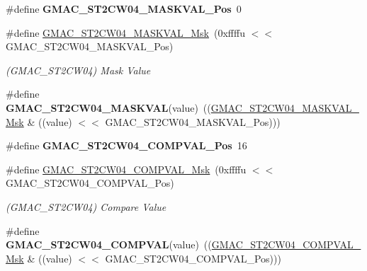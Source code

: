 \begin{DoxyCompactItemize}
\#define {\bfseries G\+M\+A\+C\+\_\+\+S\+T2\+C\+W04\+\_\+\+M\+A\+S\+K\+V\+A\+L\+\_\+\+Pos}~0
\item 
\mbox{\label{group__SAME70__GMAC_ga4394077d563ce8a66f566e49b3370d14}} 
\#define \mbox{\hyperlink{group__SAME70__GMAC_ga4394077d563ce8a66f566e49b3370d14}{G\+M\+A\+C\+\_\+\+S\+T2\+C\+W04\+\_\+\+M\+A\+S\+K\+V\+A\+L\+\_\+\+Msk}}~(0xffffu $<$$<$ G\+M\+A\+C\+\_\+\+S\+T2\+C\+W04\+\_\+\+M\+A\+S\+K\+V\+A\+L\+\_\+\+Pos)
\begin{DoxyCompactList}\small\item\em (G\+M\+A\+C\+\_\+\+S\+T2\+C\+W04) Mask Value \end{DoxyCompactList}\item 
\mbox{\label{group__SAME70__GMAC_ga77a548f54616a0c94acf93e1614e2536}} 
\#define {\bfseries G\+M\+A\+C\+\_\+\+S\+T2\+C\+W04\+\_\+\+M\+A\+S\+K\+V\+AL}(value)~((\mbox{\hyperlink{group__SAMV71__GMAC_ga4394077d563ce8a66f566e49b3370d14}{G\+M\+A\+C\+\_\+\+S\+T2\+C\+W04\+\_\+\+M\+A\+S\+K\+V\+A\+L\+\_\+\+Msk}} \& ((value) $<$$<$ G\+M\+A\+C\+\_\+\+S\+T2\+C\+W04\+\_\+\+M\+A\+S\+K\+V\+A\+L\+\_\+\+Pos)))
\item 
\mbox{\label{group__SAME70__GMAC_ga17bb7bc450aeda5e82c91e61132378c4}} 
\#define {\bfseries G\+M\+A\+C\+\_\+\+S\+T2\+C\+W04\+\_\+\+C\+O\+M\+P\+V\+A\+L\+\_\+\+Pos}~16
\item 
\mbox{\label{group__SAME70__GMAC_gaf395aed83489a7df656bd43f1b89c043}} 
\#define \mbox{\hyperlink{group__SAME70__GMAC_gaf395aed83489a7df656bd43f1b89c043}{G\+M\+A\+C\+\_\+\+S\+T2\+C\+W04\+\_\+\+C\+O\+M\+P\+V\+A\+L\+\_\+\+Msk}}~(0xffffu $<$$<$ G\+M\+A\+C\+\_\+\+S\+T2\+C\+W04\+\_\+\+C\+O\+M\+P\+V\+A\+L\+\_\+\+Pos)
\begin{DoxyCompactList}\small\item\em (G\+M\+A\+C\+\_\+\+S\+T2\+C\+W04) Compare Value \end{DoxyCompactList}\item 
\mbox{\label{group__SAME70__GMAC_gac5c4956a0393e613980b427d23590974}} 
\#define {\bfseries G\+M\+A\+C\+\_\+\+S\+T2\+C\+W04\+\_\+\+C\+O\+M\+P\+V\+AL}(value)~((\mbox{\hyperlink{group__SAMV71__GMAC_gaf395aed83489a7df656bd43f1b89c043}{G\+M\+A\+C\+\_\+\+S\+T2\+C\+W04\+\_\+\+C\+O\+M\+P\+V\+A\+L\+\_\+\+Msk}} \& ((value) $<$$<$ G\+M\+A\+C\+\_\+\+S\+T2\+C\+W04\+\_\+\+C\+O\+M\+P\+V\+A\+L\+\_\+\+Pos)))

\end{DoxyCompactItemize}
